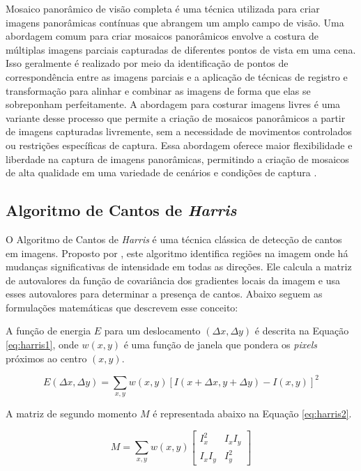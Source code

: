 Mosaico panorâmico de visão completa é uma técnica utilizada para criar imagens panorâmicas contínuas que abrangem um amplo campo de visão. Uma abordagem comum para criar mosaicos panorâmicos envolve a costura de múltiplas imagens parciais capturadas de diferentes pontos de vista em uma cena. Isso geralmente é realizado por meio da identificação de pontos de correspondência entre as imagens parciais e a aplicação de técnicas de registro e transformação para alinhar e combinar as imagens de forma que elas se sobreponham perfeitamente. A abordagem para costurar imagens livres é uma variante desse processo que permite a criação de mosaicos panorâmicos a partir de imagens capturadas livremente, sem a necessidade de movimentos controlados ou restrições específicas de captura. Essa abordagem oferece maior flexibilidade e liberdade na captura de imagens panorâmicas, permitindo a criação de mosaicos de alta qualidade em uma variedade de cenários e condições de captura \cite{Szeliski2006}.

\subsection{Algoritmo de Cantos de \textit{Harris}}\label{}

O Algoritmo de Cantos de \textit{Harris} é uma técnica clássica de detecção de cantos em imagens. Proposto por , este algoritmo identifica regiões na imagem onde há mudanças significativas de intensidade em todas as direções. Ele calcula a matriz de autovalores da função de covariância dos gradientes locais da imagem e usa esses autovalores para determinar a presença de cantos. Abaixo seguem as formulações matemáticas que descrevem esse conceito:

A função de energia \( E \) para um deslocamento \( (\Delta x, \Delta y) \) é descrita na Equação \ref{eq:harris1}, onde \( w(x, y) \) é uma função de janela que pondera os \textit{pixels} próximos ao centro \( (x, y) \).

\begin{equation}
    E(\Delta x, \Delta y) = \sum_{x,y} w(x, y) \left[I(x + \Delta x, y + \Delta y) - I(x, y)\right]^2
    \label{eq:harris1}
\end{equation}


A matriz de segundo momento \( M \) é representada abaixo na Equação \ref{eq:harris2}.

\begin{equation}
    M = \sum_{x,y} w(x, y) \begin{bmatrix} I_x^2 & I_x I_y \\ I_x I_y & I_y^2 \end{bmatrix}
    \label{eq:harris2}
\end{equation}


